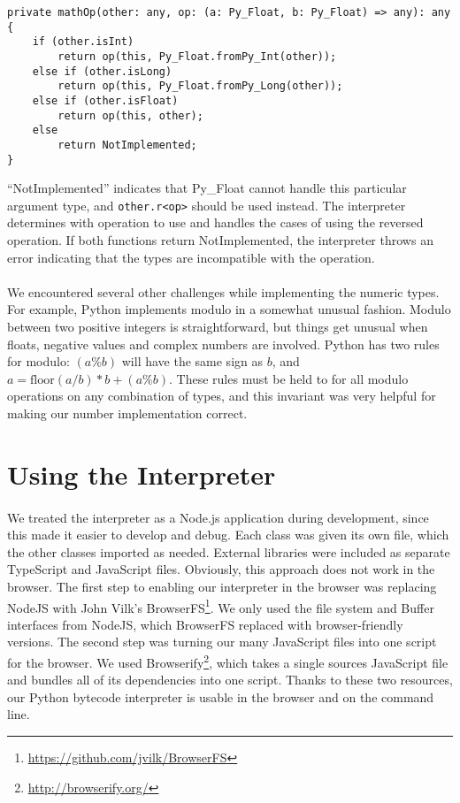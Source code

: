 \documentclass{article}
\begin{document}
\begin{verbatim}
private mathOp(other: any, op: (a: Py_Float, b: Py_Float) => any): any {
    if (other.isInt)
        return op(this, Py_Float.fromPy_Int(other));
    else if (other.isLong)
        return op(this, Py_Float.fromPy_Long(other));
    else if (other.isFloat)
        return op(this, other);
    else
        return NotImplemented;
}
\end{verbatim}

``NotImplemented'' indicates that Py\_Float cannot handle this particular argument type, and \texttt{other.r<op>} should be used instead. The interpreter determines with operation to use and handles the cases of using the reversed operation. If both functions return NotImplemented, the interpreter throws an error indicating that the types are incompatible with the operation.

\paragraph{}
We encountered several other challenges while implementing the numeric types. For example, Python implements modulo in a somewhat unusual fashion. Modulo between two positive integers is straightforward, but things get unusual when floats, negative values and complex numbers are involved. Python has two rules for modulo: $(a \% b)$ will have the same sign as $b$, and $a =  \mathrm{floor}(a / b) * b + (a \% b)$. These rules must be held to for all modulo operations on any combination of types, and this invariant was very helpful for making our number implementation correct.

\section{Using the Interpreter}

\paragraph{}
We treated the interpreter as a Node.js application during development, since this made it easier to develop and debug. Each class was given its own file, which the other classes imported as needed. External libraries were included as separate TypeScript and JavaScript files. Obviously, this approach does not work in the browser. The first step to enabling our interpreter in the browser was replacing NodeJS with John Vilk's BrowserFS\footnote{\url{https://github.com/jvilk/BrowserFS}}. We only used the file system and Buffer interfaces from NodeJS, which BrowserFS replaced with browser-friendly versions. The second step was turning our many JavaScript files into one script for the browser. We used Browserify\footnote{\url{http://browserify.org/}}, which takes a single sources JavaScript file and bundles all of its dependencies into one script. Thanks to these two resources, our Python bytecode interpreter is usable in the browser and on the command line.
\end{document}
